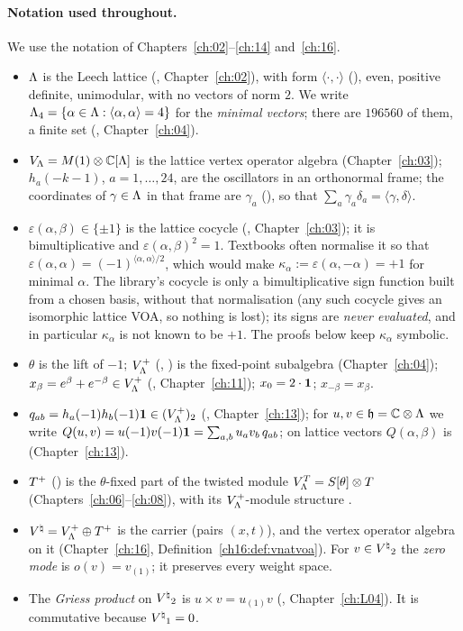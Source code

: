\paragraph{Notation used throughout.}  We use the notation of Chapters~\ref{ch:02}--\ref{ch:14} and~\ref{ch:16}.
\begin{itemize}
\item ${\Lambda}$ is the Leech lattice (, Chapter~\ref{ch:02}), with form $\langle\cdot,\cdot\rangle$
  (), even, positive definite, unimodular, with no vectors of norm $2$.  We write
  ${\Lambda}_4=\{\alpha\in{\Lambda}:\langle\alpha,\alpha\rangle=4\}$ for the \emph{minimal vectors}; there are $196560$
  of them, a finite set (, Chapter~\ref{ch:04}).
\item $V_{\Lambda}=M(1)\otimes{\mathbb{C}}[{\Lambda}]$ is the lattice vertex operator algebra (Chapter~\ref{ch:03}); $h_a(-k-1)$,
  $a=1,\dots,24$, are the oscillators in an orthonormal frame; the coordinates of $\gamma\in{\Lambda}$ in that frame are
  $\gamma_a$ (), so that $\sum_a\gamma_a\delta_a=\langle\gamma,\delta\rangle$.
\item $\varepsilon(\alpha,\beta)\in\{\pm1\}$ is the lattice cocycle (,
  Chapter~\ref{ch:03}); it is bimultiplicative and $\varepsilon(\alpha,\beta)^2=1$.  Textbooks often normalise it
  so that $\varepsilon(\alpha,\alpha)=(-1)^{\langle\alpha,\alpha\rangle/2}$, which would make $\kappa_\alpha:=\varepsilon(\alpha,-\alpha)=+1$ for
  minimal $\alpha$.  The library's cocycle is only a bimultiplicative sign function built from a chosen basis, without that
  normalisation (any such cocycle gives an isomorphic lattice VOA, so nothing is lost); its signs are \emph{never evaluated},
  and in particular $\kappa_\alpha$ is not known to be $+1$.  The proofs below keep $\kappa_\alpha$ symbolic.
\item $\theta$ is the lift of $-1$; $V_{\Lambda}^{+}$ (, ) is the fixed-point
  subalgebra (Chapter~\ref{ch:04}); $x_\beta=e^\beta+e^{-\beta}\in V_{\Lambda}^{+}$ (,
  Chapter~\ref{ch:11}); $x_0=2\cdot\mathbf 1$; $x_{-\beta}=x_\beta$.
\item $q_{ab}=h_a(-1)h_b(-1)\mathbf 1\in(V_{\Lambda}^{+})_2$ (, Chapter~\ref{ch:13}); for
  $u,v\in\mathfrak h={\mathbb{C}}\otimes{\Lambda}$ we write $Q(u,v)=u(-1)v(-1)\mathbf 1=\sum_{a,b}u_av_b\,q_{ab}$; on lattice
  vectors $Q(\alpha,\beta)$ is  (Chapter~\ref{ch:13}).
\item $T^{+}$ () is the $\theta$-fixed part of the twisted module $V_{\Lambda}^T=S[\theta]\otimes T$
  (Chapters~\ref{ch:06}--\ref{ch:08}), with its $V_{\Lambda}^{+}$-module structure .
\item ${V^{\natural}}=V_{\Lambda}^{+}\oplus T^{+}$ is the carrier  (pairs $(x,t)$), and  the
  vertex operator algebra on it (Chapter~\ref{ch:16}, Definition~\ref{ch16:def:vnatvoa}).  For $v\in{V^{\natural}}_2$ the
  \emph{zero mode} is $o(v)=v_{(1)}$; it preserves every weight space.
\item The \emph{Griess product} on ${V^{\natural}}_2$ is $u\times v=u_{(1)}v$ (, Chapter~\ref{ch:L04}).  It is
  commutative because ${V^{\natural}}_1=0$.
\end{itemize}
